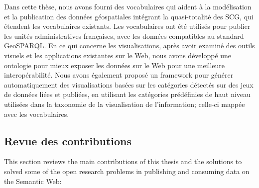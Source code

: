 \documentclass[a4paper,11pt,twoside]{report}
\begin{document}
Dans cette thèse, nous avons fourni des vocabulaires qui aident à la modélisation et la publication des données géospatiales intégrant la quasi-totalité des SCG, qui étendent les vocabulaires existants. Les vocabulaires ont été utilisés pour publier les unités administratives françaises, avec les données compatibles au standard GeoSPARQL. En ce qui concerne les visualisations, après avoir examiné des outils visuels et les applications existantes sur le Web, nous avons développé une ontologie pour mieux exposer les données sur le Web pour une meilleure interopérabilité. Nous avons également proposé un framework pour générer automatiquement des visualisations basées sur les catégories détectés sur des jeux de données liées et publiées, en utilisant les catégories prédéfinies de haut niveau  utilisées dans la taxonomie de la visualisation de l'information; celle-ci mappée avec les vocabulaires.





\subsection*{Revue des contributions}
This section reviews the main contributions of this thesis and the solutions to solved some of the open research problems in publishing and consuming data on the Semantic Web:
\end{document}
